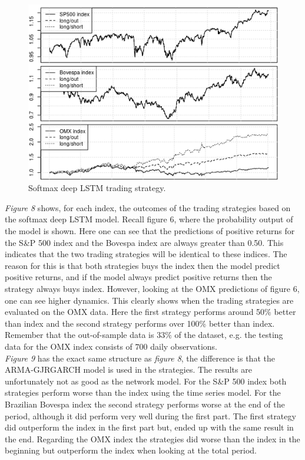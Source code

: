 \documentclass[12pt, letterpaper]{amsart}%
\begin{document}
\begin{figure}%
\caption{Softmax deep LSTM trading strategy.}
\centering
\includegraphics[scale=1]{strategy.png}
\end{figure}
\textit{Figure 8} shows, for each index, the outcomes of the trading strategies based on the softmax deep LSTM model. Recall figure 6, where the probability output of the model is shown. Here one can see that the predictions of positive returns for the S\&P 500 index and the Bovespa index are always greater than 0.50. This indicates that the two trading strategies will be identical to these indices. The reason for this is that both strategies buys the index then the model predict positive returns, and if the model always predict positive returns then the strategy always buys index. However, looking at the OMX predictions of figure 6, one can see higher dynamics. This clearly shows when the trading strategies are evaluated on the OMX data. Here the first strategy performs around 50\% better than index and the second strategy performs over 100\% better than index. Remember that the out-of-sample data is $33\%$ of the dataset, e.g. the testing data for the OMX index consists of $700$ daily observations.
\\

\textit{Figure 9} has the exact same structure as \textit{figure 8}, the difference is that the ARMA-GJRGARCH model is used in the strategies. The results are unfortunately not as good as the network model. For the S\&P 500 index both strategies perform worse than the index using the time series model. For the Brazilian Bovespa index the second strategy performs worse at the end of the period, although it did perform very well during the first part. The first strategy did outperform the index in the first part but, ended up with the same result in the end. Regarding the OMX index the strategies did worse than the index in the beginning but outperform the index when looking at the total period.
\end{document}
